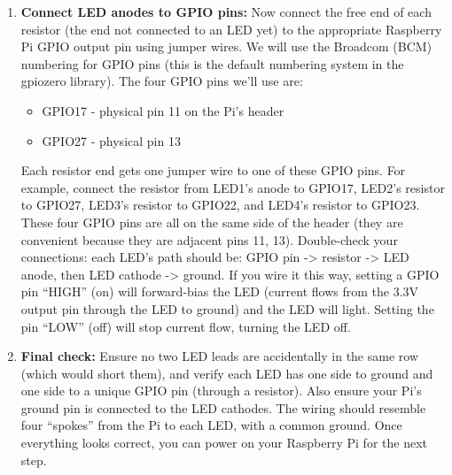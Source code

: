 \documentclass[a4paper,11pt]{article}
\begin{document}
\begin{enumerate}
    \item \textbf{Connect LED anodes to GPIO pins:} Now connect the free end of each resistor 
        (the end not connected to an LED yet) to the appropriate Raspberry Pi GPIO output pin using jumper wires. 
        We will use the Broadcom (BCM) numbering for GPIO pins (this is the default numbering system in the 
        gpiozero library). The four GPIO pins we'll use are:
        \begin{itemize}
            \item GPIO17 - physical pin 11 on the Pi's header
            \item GPIO27 - physical pin 13
        \end{itemize}

        Each resistor end gets one jumper wire to one of these GPIO pins. 
        For example, connect the resistor from LED1's anode to GPIO17, LED2's 
        resistor to GPIO27, LED3's resistor to GPIO22, and LED4's resistor to GPIO23. 
        These four GPIO pins are all on the same side of the header 
        (they are convenient because they are adjacent pins 11, 13). 
        Double-check your connections: each LED's path should be: GPIO pin -> resistor -> LED anode, 
        then LED cathode -> ground. If you wire it this way, setting a GPIO 
        pin “HIGH” (on) will forward-bias the LED (current flows from the 3.3V 
        output pin through the LED to ground) and the LED will light. Setting the 
        pin “LOW” (off) will stop current flow, turning the LED off.

    \item \textbf{Final check:} Ensure no two LED leads are accidentally in the same row 
    (which would short them), and verify each LED has one side to ground and one side to 
    a unique GPIO pin (through a resistor). Also ensure your Pi's ground pin is connected 
    to the LED cathodes. The wiring should resemble four “spokes” from the Pi to each LED, 
    with a common ground. Once everything looks correct, you can power on your Raspberry Pi 
    for the next step.

\end{enumerate}
\end{document}

